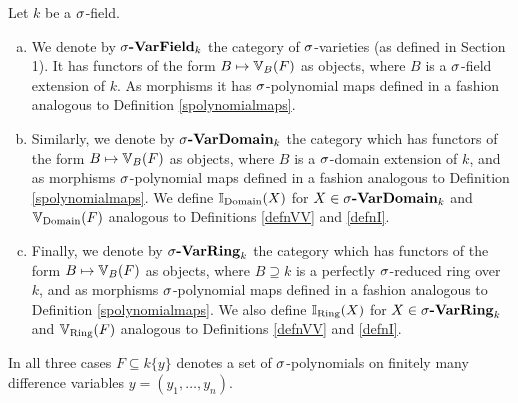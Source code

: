 \begin{defn}
Let $k$ be a $\sigma$-field. 
\begin{enumerate}[(a)]
\item We denote by $\sigma\text{{\normalfont\textbf{-VarField}}}_k$ the category of $\sigma$-varieties (as defined in Section 1). It has functors of the form $B \mapsto \mathbb{V}_B(F)$ as objects, where $B$ is a $\sigma$-field extension of $k$.
As morphisms it has $\sigma$-polynomial maps defined in a fashion analogous to Definition \ref{spolynomialmaps}. 
\item Similarly, we denote by $\sigma\text{{\normalfont\textbf{-VarDomain}}}_k$ the category which has functors of the form $B \mapsto \mathbb{V}_B(F)$ as objects, where $B$ is a $\sigma$-domain extension of $k$,
 and as morphisms $\sigma$-polynomial maps defined in a fashion analogous to Definition \ref{spolynomialmaps}. We define $\mathbb{I}_{\operatorname{Domain}}(X)$ for $X \in \sigma\text{{\normalfont\textbf{-VarDomain}}}_k$ and $\mathbb{V}_{\operatorname{Domain}}(F)$ analogous to Definitions \ref{defnVV} and \ref{defnI}.
\item Finally,  we denote by $\sigma\text{{\normalfont\textbf{-VarRing}}}_k$ the category which has functors of the form $B \mapsto \mathbb{V}_B(F)$ as objects, where $B \supseteq k$ is a perfectly $\sigma$-reduced ring over $k$,
 and as morphisms $\sigma$-polynomial maps defined in a fashion analogous to Definition \ref{spolynomialmaps}. We also define $\mathbb{I}_{\operatorname{Ring}}(X)$ for $X \in \sigma\text{{\normalfont\textbf{-VarRing}}}_k$ and $\mathbb{V}_{\operatorname{Ring}}(F)$ analogous to Definitions \ref{defnVV} and \ref{defnI}.
\end{enumerate}
In all three cases $F \subseteq k\{y\}$ denotes a set of $\sigma$-polynomials on finitely many difference variables $y = (y_1, \ldots, y_n)$.
\end{defn}

